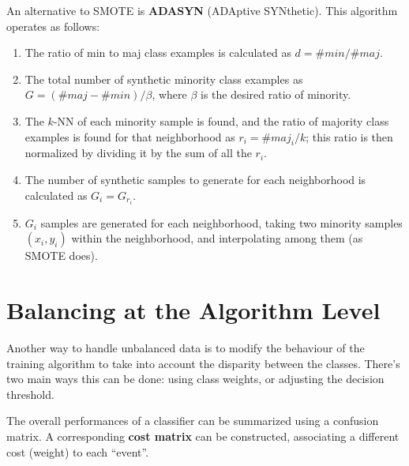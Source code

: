 An alternative to SMOTE is \textbf{ADASYN} (ADAptive SYNthetic). This algorithm operates as follows:
\begin{enumerate}
    \item The ratio of min to maj class examples is calculated as $d = \#min/\#maj$.

    \item The total number of synthetic minority class examples as $G = (\#maj - \#min) / \beta$, where $\beta$ is the desired ratio of minority.

    \item The $k$-NN of each minority sample is found, and the ratio of majority class examples is found for that neighborhood as $r_i = \#maj_i / k$; this ratio is then normalized by dividing it by the sum of all the $r_i$.

    \item The number of synthetic samples to generate for each neighborhood is calculated as $G_i = G_{r_i}$.

    \item $G_i$ samples are generated for each neighborhood, taking two minority samples $(x_i, y_i)$ within the neighborhood, and interpolating among them (as SMOTE does).
\end{enumerate}

\section{Balancing at the Algorithm Level}

Another way to handle unbalanced data is to modify the behaviour of the training algorithm to take into account the disparity between the classes. There's two main ways this can be done: using class weights, or adjusting the decision threshold.

The overall performances of a classifier can be summarized using a confusion matrix. A corresponding \textbf{cost matrix} can be constructed, associating a different cost (weight) to each ``event''.

